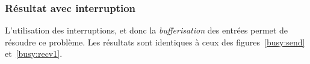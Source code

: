 \documentclass{article}
\begin{document}
\subsubsection{Résultat avec interruption}
L'utilisation des interruptions, et donc la \emph{bufferisation} des entrées permet de résoudre ce problème. Les résultats sont identiques à ceux des figures~\ref{busy:send} et~\ref{busy:recv1}.
\end{document}
